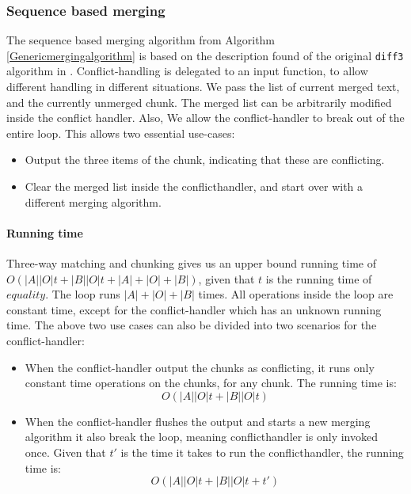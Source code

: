 \documentclass[11pt]{article}
\begin{document}
\subsubsection{Sequence based merging}
The sequence based merging algorithm from Algorithm \ref{Genericmergingalgorithm} is based on the description found of the original \texttt{diff3} algorithm in \citet{Khanna}. Conflict-handling is delegated to an input function, to allow different handling in different situations. We pass the list of current merged text, and the currently unmerged chunk. The merged list can be arbitrarily modified inside the conflict handler. Also, We allow the conflict-handler to break out of the entire loop. This allows two essential use-cases:

\begin{itemize}
   \item Output the three items of the chunk, indicating that these are conflicting.
   \item Clear the merged list inside the conflicthandler, and start over with a different merging algorithm.
\end{itemize}

\paragraph{Running time} Three-way matching and chunking gives us an upper bound running time of $O(|A||O| t + |B||O| t + |A|+|O|+|B|)$, given that $t$ is the running time of $equality$. The loop runs $|A|+|O|+|B|$ times. All operations inside the loop are constant time, except for the conflict-handler which has an unknown running time. The above two use cases can also be divided into two scenarios for the conflict-handler:

\begin{itemize}
	\item When the conflict-handler output the chunks as conflicting, it runs only constant time operations on the chunks, for any chunk. The running time is:\\
		\begin{equation}
			O(|A||O| t + |B||O| t) \nonumber
		\end{equation}

	
	\item When the conflict-handler flushes the output and starts a new merging algorithm it also break the loop, meaning conflicthandler is only invoked once. Given that $t'$ is the time it takes to run the conflicthandler, the running time is:\\
		\begin{equation}
			O(|A||O| t + |B||O| t + t') \nonumber
		\end{equation}

\end{itemize}
\end{document}
